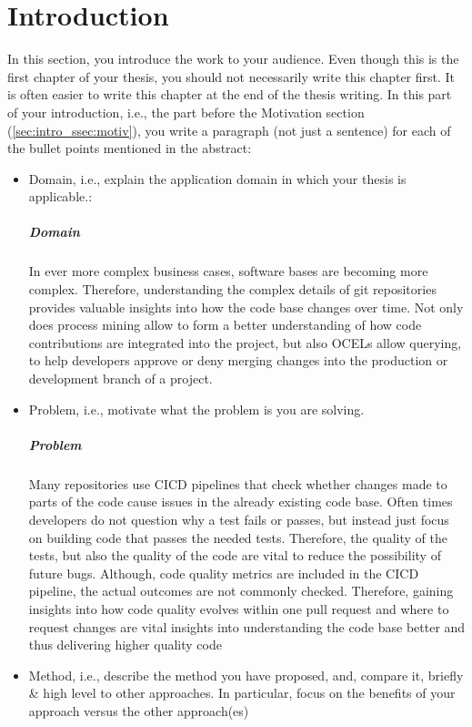\chapter{Introduction}
\label{chap:intro}

In this section, you introduce the work to your audience.
Even though this is the first chapter of your thesis, you should not necessarily write this chapter first.
It is often easier to write this chapter at the end of the thesis writing.
In this part of your introduction, i.e., the part before the Motivation section (\cref{sec:intro_ssec:motiv}), you write a paragraph (not just a sentence) for each of the bullet points mentioned in the abstract:

\begin{itemize}
	\item Domain, i.e., explain the application domain in which your thesis is applicable.:
	\paragraph{Domain} In ever more complex business cases, software bases are becoming more complex. Therefore, understanding the complex details of git repositories provides valuable insights into how the code base changes over time. Not only does process mining allow to form a better understanding of how code contributions are integrated into the project, but also \acp{OCEL}  allow querying, to help developers approve or deny merging changes into the production or development branch of a project. 
	\item Problem, i.e., motivate what the problem is you are solving.
	\paragraph{Problem} Many repositories use \ac{CICD} pipelines that check whether changes made to parts of the code cause issues in the already existing code base. Often times developers do not question why a test fails or passes, but instead just focus on building code that passes the needed tests. Therefore, the quality of the tests, but also the quality of the code are vital to reduce the possibility of future bugs. Although, code quality metrics are included in the \ac{CICD} pipeline, the actual outcomes are not commonly checked. Therefore, gaining insights into how code quality evolves within one pull request and where to request changes are vital insights into understanding the code base better and thus delivering higher quality code
	\item Method, i.e., describe the method you have proposed, and, compare it, briefly \& high level to other approaches. In particular, focus on the benefits of your approach versus the other approach(es)

\end{itemize}

